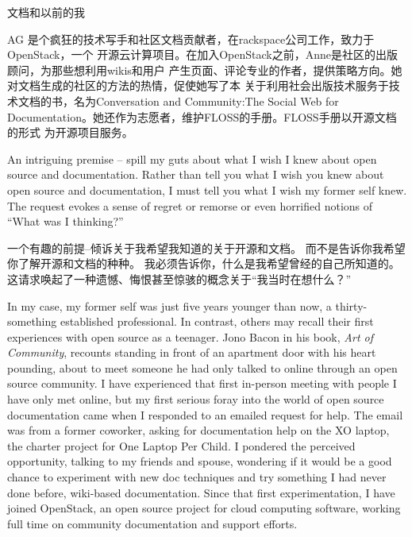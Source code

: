 {文档和以前的我}

{
AG 是个疯狂的技术写手和社区文档贡献者，在rackspace公司工作，致力于OpenStack，一个
开源云计算项目。在加入OpenStack之前，Anne是社区的出版顾问，为那些想利用wikis和用户
产生页面、评论专业的作者，提供策略方向。她对文档生成的社区的方法的热情，促使她写了本
关于利用社会出版技术服务于技术文档的书，名为Conversation and Community:The Social
 Web for Documentation。她还作为志愿者，维护FLOSS的手册。FLOSS手册以开源文档的形式
为开源项目服务。
}

\noindent{}An intriguing premise -- spill my guts about what I wish I knew about open
source and documentation. Rather than tell you what I wish you knew about open
source and documentation, I must tell you what I wish my former self knew. The
request evokes a sense of regret or remorse or even horrified notions of ``What
was I thinking?'' 

一个有趣的前提--倾诉关于我希望我知道的关于开源和文档。
而不是告诉你我希望你了解开源和文档的种种。
我必须告诉你，什么是我希望曾经的自己所知道的。
这请求唤起了一种遗憾、悔恨甚至惊骇的概念关于``我当时在想什么？''

In my case, my former self was just five years younger than now, a
thirty-something established professional. In contrast, others may recall their
first experiences with open source as a teenager. Jono Bacon in his book,
\textit{Art of Community}, recounts standing in front of an apartment door with
his heart pounding, about to meet someone he had only talked to online through
an open source community. I have experienced that first in-person meeting with
people I have only met online, but my first serious foray into the world of open
source documentation came when I responded to an emailed request for help. The
email was from a former coworker, asking for documentation help on the XO
laptop, the charter project for One Laptop Per Child. I pondered the perceived
opportunity, talking to my friends and spouse, wondering if it would be a good
chance to experiment with new doc techniques and try something I had never done
before, wiki-based documentation. Since that first experimentation, I have joined
OpenStack, an open source project for cloud computing software, working full
time on community documentation and support efforts. 

